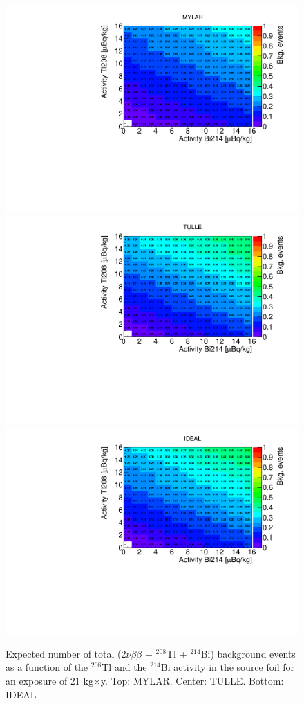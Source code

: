 \documentclass[main.tex]{subfiles}
\begin{document}
\begin{figure}[h!]
\centering
\includegraphics[scale=0.5]{pictures/Chap4/MYLAR_no2nu.pdf}
\includegraphics[scale=0.5]{pictures/Chap4/TULLE_no2nu.pdf}
\includegraphics[scale=0.5]{pictures/Chap4/IDEAL_no2nu.pdf}
\label{Nbkg_3designs}
\caption{Expected number of total (2$\nu\beta\beta$ + $^{\text{208}}$Tl + $^{\text{214}}$Bi) background events as a function of the $^{\text{208}}$Tl and the $^{\text{214}}$Bi activity in the source foil for an exposure of 21 kg$\times$y. Top: MYLAR. Center: TULLE. Bottom: IDEAL}
\end{figure}
\end{document}
